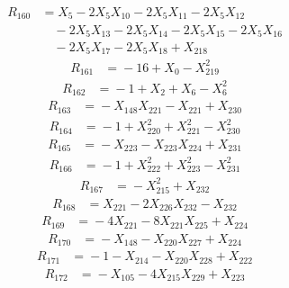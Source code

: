 \[\begin{aligned}
R_{160} &={}X_{5} - 2X_{5}X_{10} - 2X_{5}X_{11} - 2X_{5}X_{12}\\
&\quad{} - 2X_{5}X_{13} - 2X_{5}X_{14} - 2X_{5}X_{15} - 2X_{5}X_{16}\\
&\quad{} - 2X_{5}X_{17} - 2X_{5}X_{18} + X_{218}
\end{aligned}\]
\[\begin{aligned}
R_{161} &={}-16 + X_{0} - X_{219}^{2}
\end{aligned}\]
\[\begin{aligned}
R_{162} &={}-1 + X_{2} + X_{6} - X_{6}^{2}
\end{aligned}\]
\[\begin{aligned}
R_{163} &={}-X_{148}X_{221} - X_{221} + X_{230}
\end{aligned}\]
\[\begin{aligned}
R_{164} &={}-1 + X_{220}^{2} + X_{221}^{2} - X_{230}^{2}
\end{aligned}\]
\[\begin{aligned}
R_{165} &={}-X_{223} - X_{223}X_{224} + X_{231}
\end{aligned}\]
\[\begin{aligned}
R_{166} &={}-1 + X_{222}^{2} + X_{223}^{2} - X_{231}^{2}
\end{aligned}\]
\[\begin{aligned}
R_{167} &={}-X_{215}^{2} + X_{232}
\end{aligned}\]
\[\begin{aligned}
R_{168} &={}X_{221} - 2X_{226}X_{232} - X_{232}
\end{aligned}\]
\[\begin{aligned}
R_{169} &={}-4X_{221} - 8X_{221}X_{225} + X_{224}
\end{aligned}\]
\[\begin{aligned}
R_{170} &={}-X_{148} - X_{220}X_{227} + X_{224}
\end{aligned}\]
\[\begin{aligned}
R_{171} &={}-1 - X_{214} - X_{220}X_{228} + X_{222}
\end{aligned}\]
\[\begin{aligned}
R_{172} &={}-X_{105} - 4X_{215}X_{229} + X_{223}
\end{aligned}\]
